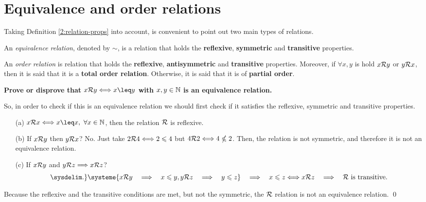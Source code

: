 
\section{Equivalence and order relations}
Taking Definition \ref{2:relation-props} into account, is convenient to point out two main types of
relations.

\begin{defi}
    An \textit{equivalence relation}, denoted by $\sim$, is a relation that
    holds the \textbf{reflexive}, \textbf{symmetric} and \textbf{transitive} properties.
\end{defi}

\begin{defi}
    An \textit{order relation} is relation that holds the \textbf{reflexive},
    \textbf{antisymmetric} and \textbf{transitive} properties. Moreover, if $\forall x, y$ is hold $x\mathcal{R} y$
    or $y\mathcal{R} x$, then it is said that it is a \textbf{total order relation}. Otherwise, it is said that it
    is of \textbf{partial order}.
\end{defi}

\begin{example}
    \textbf{Prove or disprove that $x\rela y\iff x\leq y$ with $x, y\in\mathbb{N}$ is an equivalence relation.}

    So, in order to check if this is an equivalence relation we should first check if it satisfies the
    reflexive, symmetric and transitive properties.

    \begin{itemize}
        \item[(a)] $x\rela x \iff x\leq x,\ \forall x\in\N$, then the relation $\mathcal{R}$ is reflexive.
        \item[(b)] If $x\mathcal{R} y$ then $y\mathcal{R} x$? No. Just take $2\mathcal{R} 4 \Longleftrightarrow 2\leqslant 4$ but $4\mathcal{R} 2
            \Longleftrightarrow 4\nleqslant 2$. Then, the relation is not symmetric, and therefore it is not an equivalence
            relation.
        \item[(c)] If $x\mathcal{R} y$ and $y\mathcal{R} z \Longrightarrow x\mathcal{R} z$?
            \begin{equation}
                \sysdelim.\}\systeme{x\rela y \quad\implies\quad x\leqslant y,y\rela z \quad\implies\quad y\leqslant z}
                \quad\implies\quad x\leqslant z \iff x\rela z\quad\implies\quad\rela\textrm{ is transitive.}
            \end{equation}
    \end{itemize}
    Because the reflexive and the transitive conditions are met, but not the symmetric, the $\mathcal{R}$ relation is not an equivalence relation.
    \qed
\end{example}

